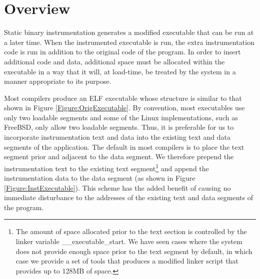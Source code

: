 \section{Overview}

Static binary instrumentation generates a modified executable 
 that can be run at a later time. When the instrumented executable is
run, the extra instrumentation code is run
in addition to the original code of the program. In order to insert additional code
and data, additional space must be allocated within the executable in a way that it
will, at load-time, be treated by the system in a manner appropriate to its
purpose. 

Most compilers produce an ELF executable whose
structure is similar to that shown in Figure \ref{Figure:OrigExecutable}. By
convention, most executables use only two loadable segments and some of the Linux
implementations, such as FreeBSD, only allow two loadable segments. Thus, it is
preferable for us to incorporate instrumentation text and data into the
existing text and data segments of the application. The default in most
compilers is to place the text segment prior and adjacent to the data segment.
We therefore prepend the instrumentation text to the existing text
segment\footnote{The amount of space allocated prior to the text section is
controlled by the linker variable \_\_executable\_start. We have seen cases
where the system does not provide enough space prior to the text segment by
default, in which case we provide a set of tools that produces a modified linker
script that provides up to 128MB of space.} and append the instrumentation data to the
data segment (as shown in Figure \ref{Figure:InstExecutable}). This
scheme has the added benefit of causing no immediate disturbance to the
addresses of the existing text and data segments of the program.

